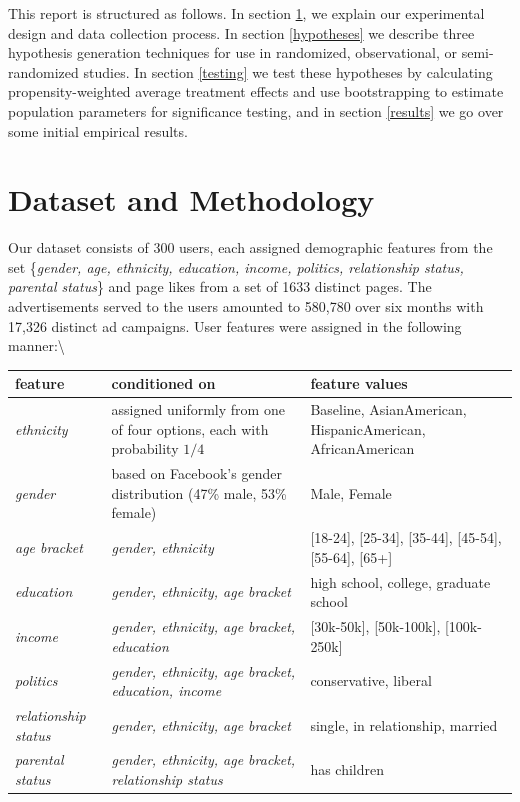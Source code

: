 \documentclass[]{article}
\begin{document}
This report is structured as follows. In section \ref{dataset}, we
explain our experimental design and data collection process. In section
\ref{hypotheses} we describe three hypothesis generation techniques for
use in randomized, observational, or semi-randomized studies. In section
\ref{testing} we test these hypotheses by calculating
propensity-weighted average treatment effects and use bootstrapping to
estimate population parameters for significance testing, and in section
\ref{results} we go over some initial empirical results.

\hypertarget{dataset}{%
\section{Dataset and Methodology}\label{dataset}}

Our dataset consists of 300 users, each assigned demographic features
from the set
\{\textit{gender, age, ethnicity, education, income, politics, relationship status, parental status}\}
and page likes from a set of 1633 distinct pages. The advertisements
served to the users amounted to 580,780 over six months with 17,326
distinct ad campaigns. User features were assigned in the following
manner:\textbackslash{}

\begin{table}
\begin{tabular}{p{}|p{}|p{}}
             \textbf{feature}&\textbf{conditioned on}&\textbf{feature values}  \\
             \hline
             \textit{ethnicity} & assigned uniformly from one of four options, each with probability $1/4$ & Baseline, AsianAmerican, HispanicAmerican, AfricanAmerican\\
             \hline
             \textit{gender} & based on Facebook's gender distribution (47\% male, 53\% female) & Male, Female\\
             \hline
             \textit{age bracket} & \textit{gender, ethnicity} & [18-24], [25-34], [35-44], [45-54], [55-64], [65+]\\
             \hline
             \textit{education} & \textit{gender, ethnicity, age bracket} & high school, college, graduate school\\
             \hline
             \textit{income} & \textit{gender, ethnicity, age bracket, education} & [30k-50k], [50k-100k], [100k-250k] \\
             \hline
             \textit{politics} & \textit{gender, ethnicity, age bracket, education, income} & conservative, liberal\\
             \hline
             \textit{relationship status} & \textit{gender, ethnicity, age bracket} & single, in relationship, married\\
             \hline
             \textit{parental status} & \textit{gender, ethnicity, age bracket, relationship status} & has children\\
             \hline
\end{tabular}
\end{table}
\end{document}
